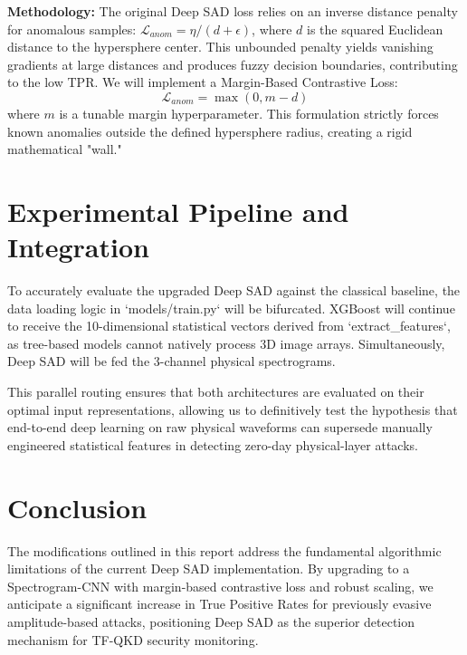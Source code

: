 \documentclass[10pt, conference]{IEEEtran}
\begin{document}
\textbf{Methodology:} The original Deep SAD loss relies on an inverse distance penalty for anomalous samples: $\mathcal{L}_{anom} = \eta / (d + \epsilon)$, where $d$ is the squared Euclidean distance to the hypersphere center. This unbounded penalty yields vanishing gradients at large distances and produces fuzzy decision boundaries, contributing to the low TPR. We will implement a Margin-Based Contrastive Loss:
\begin{equation}
\mathcal{L}_{anom} = \max(0, m - d)
\end{equation}
where $m$ is a tunable margin hyperparameter. This formulation strictly forces known anomalies outside the defined hypersphere radius, creating a rigid mathematical "wall."

\section{Experimental Pipeline and Integration}

To accurately evaluate the upgraded Deep SAD against the classical baseline, the data loading logic in `models/train.py` will be bifurcated. XGBoost will continue to receive the 10-dimensional statistical vectors derived from `extract_features`, as tree-based models cannot natively process 3D image arrays. Simultaneously, Deep SAD will be fed the 3-channel physical spectrograms. 

This parallel routing ensures that both architectures are evaluated on their optimal input representations, allowing us to definitively test the hypothesis that end-to-end deep learning on raw physical waveforms can supersede manually engineered statistical features in detecting zero-day physical-layer attacks.

\section{Conclusion}
The modifications outlined in this report address the fundamental algorithmic limitations of the current Deep SAD implementation. By upgrading to a Spectrogram-CNN with margin-based contrastive loss and robust scaling, we anticipate a significant increase in True Positive Rates for previously evasive amplitude-based attacks, positioning Deep SAD as the superior detection mechanism for TF-QKD security monitoring.
\end{document}

